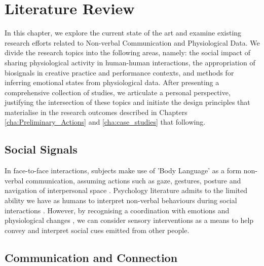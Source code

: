 

\chapter{Literature Review}
\label{cha:lit_review}

In this chapter, we explore the current state of the art and examine existing research efforts related to Non-verbal Communication and Physiological Data. We divide the research topics into the following areas, namely: the social impact of sharing physiological activity in human-human interactions, the appropriation of biosignals in creative practice and performance contexts, and methods for inferring emotional states from physiological data. After presenting a comprehensive collection of studies, we articulate a personal perspective, justifying the intersection of these topics and initiate the design principles that materialise in the research outcomes described in Chapters \ref{cha:Preliminary_Actions} and \ref{cha:case_studies} that following.

\section{Social Signals}

In face-to-face interactions, subjects make use of 'Body Language' as a form non-verbal communication, assuming actions such as gaze, gestures, posture and navigation of interpersonal space \cite{dobre_immersive_2022}. Psychology literature admits to the limited ability we have as humans to interpret non-verbal behaviours during social interactions \cite{joseph_emotional_2010}. However, by recognising a coordination with emotions and physiological changes \cite{mayer_human_2008}, we can consider sensory interventions as a means to help convey and interpret social cues emitted from other people.

\section{Communication and Connection}
\label{lit_review:biosignals_sharing}


